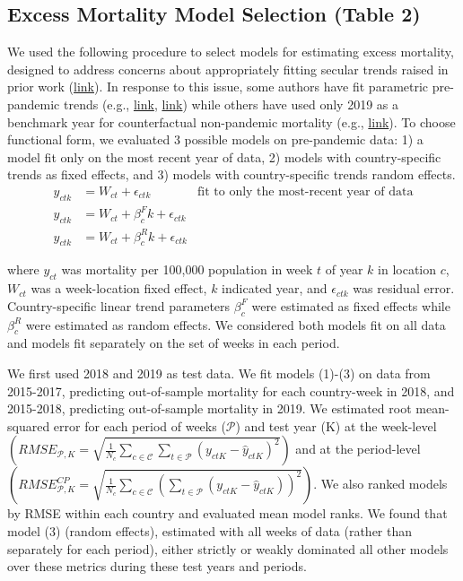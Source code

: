 \documentclass[
]{article}
\begin{document}
\hypertarget{excess-mortality-model-selection-table-2}{%
\subsection{Excess Mortality Model Selection (Table
2)}\label{excess-mortality-model-selection-table-2}}

We used the following procedure to select models for estimating excess
mortality, designed to address concerns about appropriately fitting
secular trends raised in prior work
(\href{https://www.nber.org/papers/w29503}{link}). In response to this
issue, some authors have fit parametric pre-pandemic trends (e.g.,
\href{https://www.nber.org/papers/w29503}{link},
\href{https://www.nber.org/papers/w30104}{link}) while others have used
only 2019 as a benchmark year for counterfactual non-pandemic mortality
(e.g., \href{https://www.nber.org/papers/w30512}{link}). To choose
functional form, we evaluated 3 possible models on pre-pandemic data: 1)
a model fit only on the most recent year of data, 2) models with
country-specific trends as fixed effects, and 3) models with
country-specific trends random effects. \begin{align}
y_{ctk} &= {W}_{ct} + \epsilon_{ctk} &\text{fit to only the most-recent year of data}\\
y_{ctk} &= {W}_{ct} + \beta_c^F k + \epsilon_{ctk} \\
y_{ctk} &= {W}_{ct} + \beta_c^R k + \epsilon_{ctk} 
\end{align}

where \(y_{ct}\) was mortality per 100,000 population in week \(t\) of
year \(k\) in location \(c\), \({W}_{ct}\) was a week-location fixed
effect, \(k\) indicated year, and \(\epsilon_{ctk}\) was residual error.
Country-specific linear trend parameters \(\beta_c^F\) were estimated as
fixed effects while \(\beta_c^R\) were estimated as random effects. We
considered both models fit on all data and models fit separately on the
set of weeks in each period.

We first used 2018 and 2019 as test data. We fit models (1)-(3) on data
from 2015-2017, predicting out-of-sample mortality for each country-week
in 2018, and 2015-2018, predicting out-of-sample mortality in 2019. We
estimated root mean-squared error for each period of weeks
(\(\mathcal{P}\)) and test year (K) at the week-level
\(\left(RMSE_{\mathcal{P}, K} = \sqrt{\frac{1}{N_c} \sum_{c \in \mathcal{C}} \sum_{t \in \mathcal{P}} \left(y_{ctK}-\hat{y}_{ctK}\right)^2}\right)\)
and at the period-level
\(\left(RMSE_{\mathcal{P}, K}^{CP} = \sqrt{\frac{1}{N_c} \sum_{c \in \mathcal{C}} \left(\sum_{t \in \mathcal{P}} \left(y_{ctK}-\hat{y}_{ctK}\right)\right)^2}\right)\).
We also ranked models by RMSE within each country and evaluated mean
model ranks. We found that model (3) (random effects), estimated with
all weeks of data (rather than separately for each period), either
strictly or weakly dominated all other models over these metrics during
these test years and periods.
\end{document}
